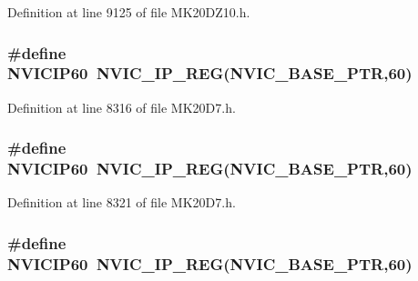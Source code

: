 Definition at line 9125 of file M\+K20\+D\+Z10.\+h.

\subsubsection[{\texorpdfstring{N\+V\+I\+C\+I\+P60}{NVICIP60}}]{\setlength{\rightskip}{0pt plus 5cm}\#define N\+V\+I\+C\+I\+P60~{\bf N\+V\+I\+C\+\_\+\+I\+P\+\_\+\+R\+EG}({\bf N\+V\+I\+C\+\_\+\+B\+A\+S\+E\+\_\+\+P\+TR},60)}\hypertarget{group___n_v_i_c___register___accessor___macros_ga6306a0db9145904eaff0087c84d95a3a}{}\label{group___n_v_i_c___register___accessor___macros_ga6306a0db9145904eaff0087c84d95a3a}


Definition at line 8316 of file M\+K20\+D7.\+h.

\subsubsection[{\texorpdfstring{N\+V\+I\+C\+I\+P60}{NVICIP60}}]{\setlength{\rightskip}{0pt plus 5cm}\#define N\+V\+I\+C\+I\+P60~{\bf N\+V\+I\+C\+\_\+\+I\+P\+\_\+\+R\+EG}({\bf N\+V\+I\+C\+\_\+\+B\+A\+S\+E\+\_\+\+P\+TR},60)}\hypertarget{group___n_v_i_c___register___accessor___macros_ga6306a0db9145904eaff0087c84d95a3a}{}\label{group___n_v_i_c___register___accessor___macros_ga6306a0db9145904eaff0087c84d95a3a}


Definition at line 8321 of file M\+K20\+D7.\+h.

\subsubsection[{\texorpdfstring{N\+V\+I\+C\+I\+P60}{NVICIP60}}]{\setlength{\rightskip}{0pt plus 5cm}\#define N\+V\+I\+C\+I\+P60~{\bf N\+V\+I\+C\+\_\+\+I\+P\+\_\+\+R\+EG}({\bf N\+V\+I\+C\+\_\+\+B\+A\+S\+E\+\_\+\+P\+TR},60)}\hypertarget{group___n_v_i_c___register___accessor___macros_ga6306a0db9145904eaff0087c84d95a3a}{}\label{group___n_v_i_c___register___accessor___macros_ga6306a0db9145904eaff0087c84d95a3a}


